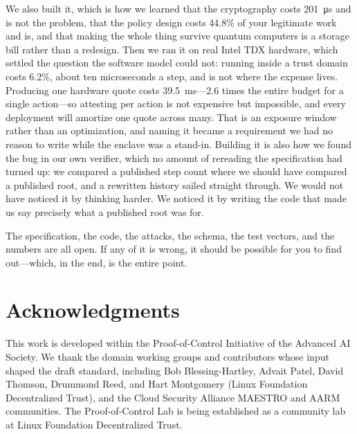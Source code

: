 \documentclass[11pt]{article}
\newcommand{\poc}{Proof-of-Control}
\begin{document}
We also built it, which is how we learned that the cryptography costs
\SI{201}{\micro\second} and is not the problem, that the policy design costs
44.8\% of your legitimate work and is, and that making the whole thing survive
quantum computers is a storage bill rather than a redesign. Then we ran it on
real Intel TDX hardware, which settled the question the software model could
not: running inside a trust domain costs 6.2\%, about ten microseconds a step,
and is not where the expense lives. Producing one hardware quote costs
\SI{39.5}{\milli\second}---2.6 times the entire budget for a single
action---so attesting per action is not expensive but impossible, and every
deployment will amortize one quote across many. That is an exposure window
rather than an optimization, and naming it became a requirement we had no
reason to write while the enclave was a stand-in. Building it is also
how we found the bug in our own verifier, which no amount of rereading the
specification had turned up: we compared a published step count where we should
have compared a published root, and a rewritten history sailed straight through.
We would not have noticed it by thinking harder. We noticed it by writing the
code that made us say precisely what a published root was for.

The specification, the code, the attacks, the schema, the test vectors, and the
numbers are all open. If any of it is wrong, it should be possible for you to
find out---which, in the end, is the entire point.


\section*{Acknowledgments}
This work is developed within the \poc{} Initiative of the Advanced AI
Society. We thank the domain working groups and contributors whose input
shaped the draft standard, including Bob Blessing-Hartley, Advait Patel,
David Thomson, Drummond Reed, and Hart Montgomery (Linux Foundation
Decentralized Trust), and the Cloud Security Alliance MAESTRO and AARM
communities. The \poc{} Lab is being established as a community lab at Linux
Foundation Decentralized Trust.

\appendix
\end{document}
